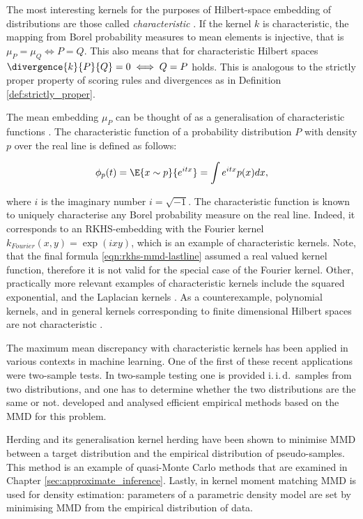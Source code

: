 The most interesting kernels for the purposes of Hilbert-space embedding of distributions are those called \emph{characteristic} \citep{Sriperumbudur2008}. If the kernel $k$ is characteristic, the mapping from Borel probability measures to mean elements is injective, that is $\mu_P = \mu_Q \iff P = Q$. This also means that for characteristic Hilbert spaces $\divergence{k}{P}{Q} = 0 \iff Q=P$ holds. This is analogous to the strictly proper property of scoring rules and divergences as in Definition \ref{def:strictly_proper}.

The mean embedding $\mu_P$ can be thought of as a generalisation of characteristic functions \citep[see \eg][]{Ord1999}. The characteristic function of a probability distribution $P$ with density $p$ over the real line is defined as follows:

\begin{equation}
	\phi_p(t) = \E{x\sim p}{e^{ i t x}} = \int e^{i t x} p(x) dx,
\end{equation}

where $i$ is the imaginary number $i=\sqrt{-1}$. The characteristic function is known to uniquely characterise any Borel probability measure on the real line. Indeed, it corresponds to an RKHS-embedding with the Fourier kernel $k_{Fourier}(x,y) = \exp(ixy)$, which is an example of characteristic kernels. Note, that the final formula \eqref{eqn:rkhs-mmd-lastline} assumed a real valued kernel function, therefore it is not valid for the special case of the Fourier kernel. Other, practically more relevant examples of characteristic kernels include the squared exponential, and the Laplacian kernels \citep[see \eg][]{Rasmussen2006}. As a counterexample, polynomial kernels, and in general kernels corresponding to finite dimensional Hilbert spaces are not characteristic \citep{Sriperumbudur2008}.

The maximum mean discrepancy with characteristic kernels has been applied in various contexts in machine learning. One of the first of these recent applications were two-sample tests. In two-sample testing one is provided i.\,i.\,d.\ samples from two distributions, and one has to determine whether the two distributions are the same or not. \citet{Gretton2012} developed and analysed efficient empirical methods based on the MMD for this problem.

Herding \citep{welling2009herding} and its generalisation kernel herding \citep{Chen2010} have been shown to minimise MMD between a target distribution and the empirical distribution of pseudo-samples. This method is an example of quasi-Monte Carlo methods that are examined in Chapter \ref{sec:approximate_inference}. Lastly, in kernel moment matching \citep{Song2008} MMD is used for density estimation: parameters of a parametric density model are set by minimising MMD from the empirical distribution of data.

